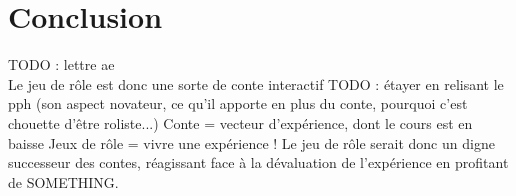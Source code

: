 \section{Conclusion}
TODO : lettre ae\\
Le jeu de rôle est donc une sorte de conte interactif
TODO : étayer en relisant le pph (son aspect novateur, ce qu'il apporte en plus du conte, pourquoi c'est chouette d'être roliste...)
Conte = vecteur d'expérience, dont le cours est en baisse
Jeux de rôle = vivre une expérience !
Le jeu de rôle serait donc un digne successeur des contes, réagissant face à la dévaluation de l'expérience en profitant de SOMETHING.

\clearpage
